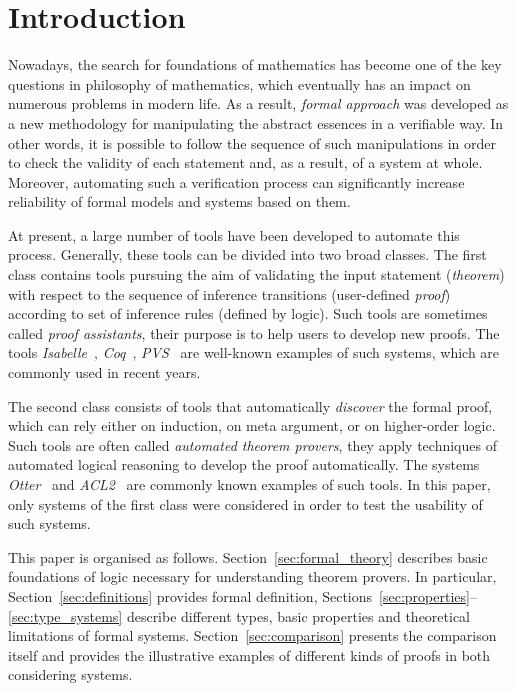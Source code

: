 \documentclass[article]{aaltoseries}
\begin{document}
\section{Introduction}
\label{sec:introduction}

Nowadays, the search for foundations of mathematics has become one of the key questions in philosophy of mathematics, which eventually has an impact on numerous problems in modern life. As a result, \textit{formal approach} was developed as a new methodology for manipulating the abstract essences in a verifiable way. In other words, it is possible to follow the sequence of such manipulations in order to check the validity of each statement and, as a result, of a system at whole. Moreover, automating such a verification process can significantly increase reliability of formal models and systems based on them.

At present, a large number of tools have been developed to automate this process. Generally, these tools can be divided into two broad classes. 
The first class contains tools pursuing the aim of validating the input statement (\textit{theorem}) with respect to the sequence of inference transitions (user-defined \textit{proof}) according to set of inference rules (defined by logic). Such tools are sometimes called \textit{proof assistants}, their purpose is to help users to develop new proofs. The tools \textit{Isabelle}~\cite{tool_Isabelle}, \textit{Coq}~\cite{tool_Coq}, \textit{PVS}~\cite{tool_Pvs} are well-known examples of such systems, which are commonly used in recent years.

The second class consists of tools that automatically \textit{discover} the formal proof, which can rely either on induction, on meta argument, or on higher-order logic. Such tools are often called \textit{automated theorem provers}, they apply techniques of automated logical reasoning to develop the proof automatically. The systems \textit{Otter}~\cite{tool_Otter} and \textit{ACL2}~\cite{tool_Acl} are commonly known examples of such tools.
In this paper, only systems of the first class were considered in order to test the usability of such systems.

This paper is organised as follows. Section~\ref{sec:formal_theory} describes basic foundations of logic necessary for understanding theorem provers. In particular, Section~\ref{sec:definitions} provides formal definition, Sections~\ref{sec:properties}--\ref{sec:type_systems} describe different types, basic properties and theoretical limitations of formal systems.
Section~\ref{sec:comparison} presents the comparison itself and provides the illustrative examples of different kinds of proofs in both considering systems.
\end{document}
